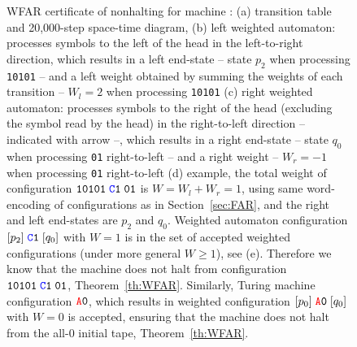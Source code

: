 \begin{figure}[h!]
\begin{minipage}[t]{0.71\textwidth}
{
        }
    \end{minipage}

    \caption{{\small WFAR certificate of nonhalting for machine : (a) transition table and 20,000-step space-time diagram, (b) left weighted automaton: processes symbols to the left of the head in the left-to-right direction, which results in a left end-state -- \eg state $p_2$ when processing \texttt{10101} -- and a left weight obtained by summing the weights of each transition -- \eg $W_l = 2$ when processing \texttt{10101} (c) right weighted automaton: processes symbols to the right of the head (excluding the symbol read by the head) in the right-to-left direction -- indicated with arrow --, which results in a right end-state -- \eg state $q_0$ when processing \texttt{01} right-to-left -- and a right weight -- \eg $W_r = -1$ when processing \texttt{01} right-to-left (d) example, the total weight of configuration $\texttt{10101}\; \texttt{\stateC}\sone\; \texttt{01}$ is $W=W_l+W_r = 1$, using same word-encoding of configurations as in Section~\ref{sec:FAR}, and the right and left end-states are $p_2$ and $q_0$. Weighted automaton configuration $[p_2]\; \texttt{\stateC}\texttt{1}\; [q_0]$ with $W = 1$ is in the set of accepted weighted configurations (under more general $W \geq 1$), see (e). Therefore we know that the machine does not halt from configuration $\texttt{10101}\; \texttt{\stateC}\sone\; \texttt{01}$, Theorem~\ref{th:WFAR}. Similarly, Turing machine configuration $\texttt{\stateA}\texttt{0}$, which results in weighted configuration $[p_0]\;\texttt{\stateA}\texttt{0}\; [q_0]$ with $W=0$ is accepted, ensuring that the machine does not halt from the all-0 initial tape, Theorem~\ref{th:WFAR}.}}\label{fig:WFAR}
\end{figure}

